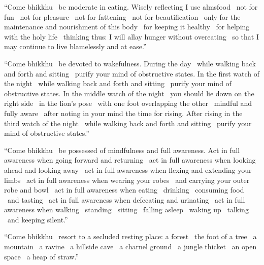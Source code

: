 “Come bhikkhu \breathmark\ be moderate in eating. Wisely reflecting I use almsfood \breathmark\ not for fun \breathmark\ not for pleasure \breathmark\ not for fattening \breathmark\ not for beautification \breathmark\ only for the maintenance and nourishment of this body \breathmark\ for keeping it healthy \breathmark\ for helping with the holy life \breathmark\ thinking thus: I will allay hunger without overeating \breathmark\ so that I may continue to live blamelessly and at ease.”

“Come bhikkhu \breathmark\ be devoted to wakefulness. During the day \breathmark\ while walking back and forth and sitting \breathmark\ purify your mind of obstructive states. In the first watch of the night \breathmark\ while walking back and forth and sitting \breathmark\ purify your mind of obstructive states. In the middle watch of the night \breathmark\ you should lie down on the right side \breathmark\ in the lion’s pose \breathmark\ with one foot overlapping the other \breathmark\ mindful and fully aware \breathmark\ after noting in your mind the time for rising. After rising in the third watch of the night \breathmark\ while walking back and forth and sitting \breathmark\ purify your mind of obstructive states.”

“Come bhikkhu \breathmark\ be possessed of mindfulness and full awareness. Act in full awareness when going forward and returning \breathmark\ act in full awareness when looking ahead and looking away \breathmark\ act in full awareness when flexing and extending your limbs \breathmark\ act in full awareness when wearing your robes \breathmark\ and carrying your outer robe and bowl \breathmark\ act in full awareness when eating \breathmark\ drinking \breathmark\ consuming food \breathmark\ and tasting \breathmark\ act in full awareness when defecating and urinating \breathmark\ act in full awareness when walking \breathmark\ standing \breathmark\ sitting \breathmark\ falling asleep \breathmark\ waking up
\breathmark\ talking \breathmark\ and keeping silent.”

“Come bhikkhu \breathmark\ resort to a secluded resting place: a forest \breathmark\ the foot of a tree \breathmark\ a mountain \breathmark\ a ravine \breathmark\ a hillside cave \breathmark\ a charnel ground \breathmark\ a jungle thicket \breathmark\ an open space \breathmark\ a heap of straw.”


